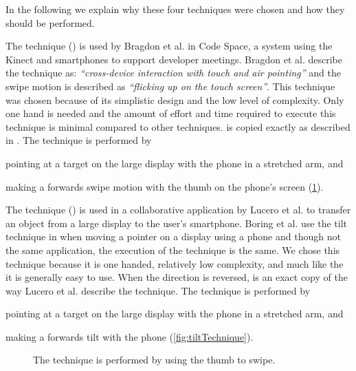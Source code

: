 In the following we explain why these four techniques were chosen and how they should be performed.

The \swipe technique () is used by Bragdon et al. \cite{Bragdon:2011} in Code Space, a system using the Kinect and smartphones to support developer meetings. 
Bragdon et al. describe the technique as: \emph{``cross-device interaction with touch and air pointing''} and the swipe motion is described as \emph{``flicking up on the touch screen''}. 
This technique was chosen because of its simplistic design and the low level of complexity.
Only one hand is needed and the amount of effort and time required to execute this technique is minimal compared to other techniques.
\swipe is copied exactly as described in \cite{Bragdon:2011}.
The \swipe technique is performed by 
\begin{enumerate*}[label=\itshape\roman*\upshape)]
	\item{pointing at a target on the large display with the phone in a stretched arm, and}
	\item{making a forwards swipe motion with the thumb on the phone's screen (\cref{fig:swipeTechnique}).}
\end{enumerate*}

The \tilt technique () is used in a collaborative application by Lucero et al. \cite{Lucero:2012} to transfer an object from a large display to the user's smartphone.
Boring et al. use the tilt technique in \cite{Boring:2009} when moving a pointer on a display using a phone and though not the same application, the execution of the technique is the same.
We chose this technique because it is one handed, relatively low complexity, and much like the \swipe it is generally easy to use.
When the direction is reversed, \tilt is an exact copy of the way Lucero et al. describe the technique.
The \tilt technique is performed by 
\begin{enumerate*}[label=\itshape\roman*\upshape)]
	\item{pointing at a target on the large display with the phone in a stretched arm, and}
	\item{making a forwards tilt with the phone (\cref{fig:tiltTechnique}).}
\end{enumerate*}

\begin{figure}[H]
\caption{
	\protect{} The \swipe technique is performed by using the thumb to swipe.
}
\label{fig:swipeTechnique}
\end{figure}

